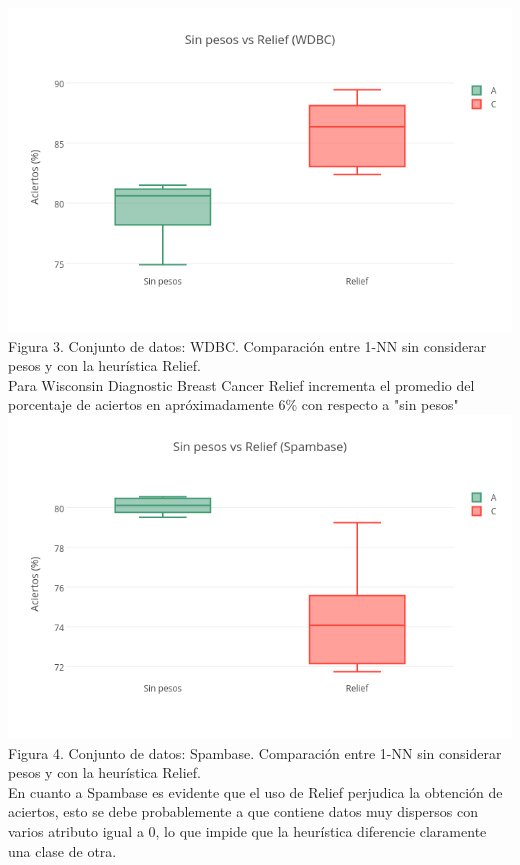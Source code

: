\documentclass{ci5652}
\begin{document}
\includegraphics[width=\columnwidth]{no_weights-Relief_WDBC}
{\small Figura 3. Conjunto de datos: WDBC. Comparación entre 1-NN sin considerar
pesos y con la heurística Relief.}\\

Para Wisconsin Diagnostic Breast Cancer Relief incrementa el promedio del
porcentaje de aciertos en apróximadamente 6\% con respecto a "sin pesos"\\

\includegraphics[width=\columnwidth]{no_weights-Relief_Spambase}
{\small Figura 4. Conjunto de datos: Spambase. Comparación entre 1-NN sin
considerar pesos y con la heurística Relief.}\\

En cuanto a Spambase es evidente que el uso de Relief perjudica la obtención de
aciertos, esto se debe probablemente a que contiene datos muy dispersos con
varios atributo igual a 0, lo que impide que la heurística diferencie claramente
una clase de otra.
\end{document}
